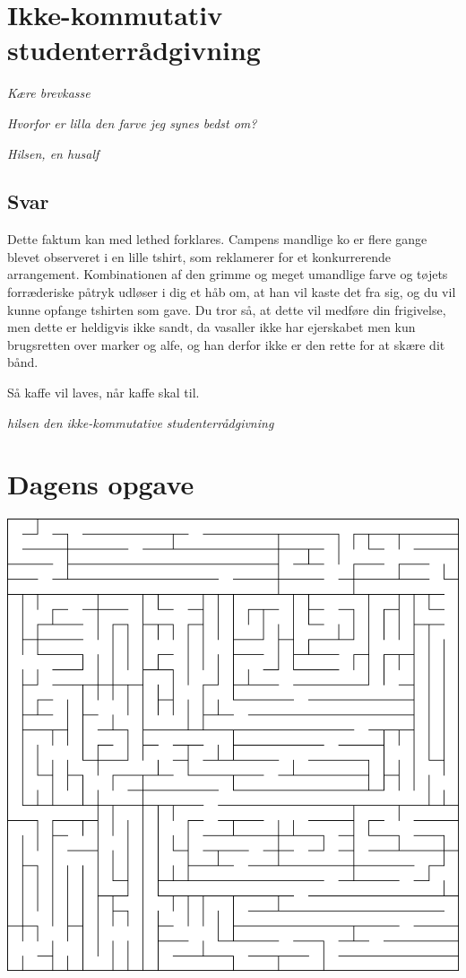 \begin{minipage}[t]{170mm}
\vspace{3mm}
\section*{Ikke-kommutativ studenterrådgivning}
\emph{Kære brevkasse}

\emph{Hvorfor er  lilla den farve jeg synes bedst om?}

\emph{Hilsen, en husalf}

\subsection*{Svar}
Dette faktum kan med lethed forklares. Campens mandlige ko er flere gange blevet observeret i en lille tshirt, som reklamerer for et konkurrerende arrangement. Kombinationen af den grimme og meget umandlige farve og tøjets forræderiske påtryk udløser i dig et håb om, at han vil kaste det fra sig, og du vil kunne opfange tshirten som gave. Du tror så, at dette vil medføre din frigivelse, men dette er heldigvis ikke sandt, da vasaller ikke har ejerskabet men kun brugsretten over marker og alfe, og han derfor ikke er den rette for at skære dit bånd.

Så kaffe vil laves, når kaffe skal til.

{\flushright\emph{hilsen den ikke-kommutative studenterrådgivning}}
\vspace{3mm}
\section*{Dagens opgave}

\includegraphics[width=\textwidth]{maze.png}


\end{minipage}
